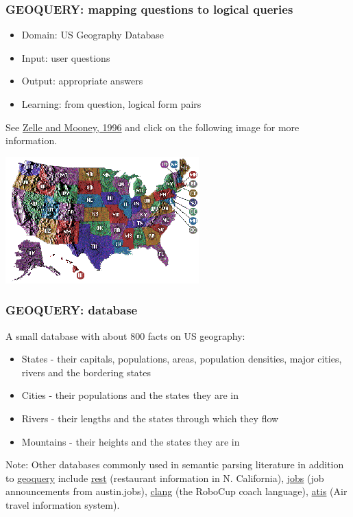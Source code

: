 \documentclass[ignorenonframetext]{beamer}
\begin{document}
\begin{frame}\frametitle{GEOQUERY: mapping questions to logical queries}

\begin{itemize}
\item Domain: US Geography Database
\item Input: user questions
\item Output: appropriate answers
\item Learning: from question, logical form pairs
\end{itemize}

See \href{http://aaaipress.org/Papers/AAAI/1996/AAAI96-156.pdf}{Zelle
  and Mooney, 1996}
and click on the following image for more information.

\begin{center}
\href{http://www.cs.utexas.edu/users/ml/geo.html}{
\includegraphics[width=.7\textwidth]{images/us-states.png}}
\end{center}

\end{frame}

\begin{frame}\frametitle{GEOQUERY: database}
A small database with about 800 facts on US geography:
\begin{itemize}
\item States - their capitals, populations, areas, population densities,
major cities, rivers and the bordering states
\item Cities - their populations and the states they are in
\item Rivers - their lengths and the states through which they flow
\item Mountains - their heights and the states they are in
\end{itemize}
\vspace*{1cm}
Note: Other databases commonly used in semantic parsing literature in addition to
\href{http://www.cs.utexas.edu/users/ml/nldata/geo.html}{\sc geoquery} include
\href{http://www.cs.utexas.edu/users/ml/nldata/restquery.html}{\sc rest} (restaurant information in N. California),
\href{http://www.cs.utexas.edu/users/ml/nldata/jobquery.html}{\sc jobs} (job announcements from austin.jobs),
\href{http://www.cs.utexas.edu/users/ml/nldata/clang.html}{\sc clang} (the RoboCup coach language),
\href{http://www.ldc.upenn.edu/Catalog/docs/LDC93S4B/corpus.html}{\sc atis} (Air travel information system).
\end{frame}
\end{document}
